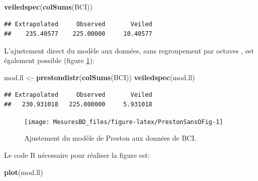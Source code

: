 \documentclass[
  11pt,
  french,
  a4paper,
  extrafontsizes,onecolumn,openright
  ]{memoir}
\newenvironment{Shaded}{\begin{snugshade}}{\end{snugshade}}
\newcommand{\FunctionTok}[1]{\textcolor[rgb]{0.13,0.29,0.53}{\textbf{#1}}}
\newcommand{\NormalTok}[1]{#1}
\newcommand{\OtherTok}[1]{\textcolor[rgb]{0.56,0.35,0.01}{#1}}
\begin{document}
\scriptsize

\begin{Shaded}
\begin{Highlighting}[]
\FunctionTok{veiledspec}\NormalTok{(}\FunctionTok{colSums}\NormalTok{(BCI))}
\end{Highlighting}
\end{Shaded}

\begin{verbatim}
## Extrapolated     Observed       Veiled 
##    235.40577    225.00000     10.40577
\end{verbatim}

\normalsize

L'ajustement direct du modèle aux données, sans regroupement par octaves \autocite{Williamson2005}, est également possible (figure \ref{fig:PrestonSansOFig}):

\scriptsize

\begin{Shaded}
\begin{Highlighting}[]
\NormalTok{mod.ll }\OtherTok{\textless{}{-}} \FunctionTok{prestondistr}\NormalTok{(}\FunctionTok{colSums}\NormalTok{(BCI))}
\FunctionTok{veiledspec}\NormalTok{(mod.ll)}
\end{Highlighting}
\end{Shaded}

\begin{verbatim}
## Extrapolated     Observed       Veiled 
##   230.931018   225.000000     5.931018
\end{verbatim}

\normalsize



\scriptsize

\begin{figure}

{\centering \texttt{[image: MesuresBD\_files/figure-latex/PrestonSansOFig-1]} 

}

\caption{Ajustement du modèle de Preston aux données de BCI.}\label{fig:PrestonSansOFig}
\end{figure}

\normalsize

Le code R nécessaire pour réaliser la figure est:

\scriptsize

\begin{Shaded}
\begin{Highlighting}[]
\FunctionTok{plot}\NormalTok{(mod.ll)}
\end{Highlighting}
\end{Shaded}
\end{document}
